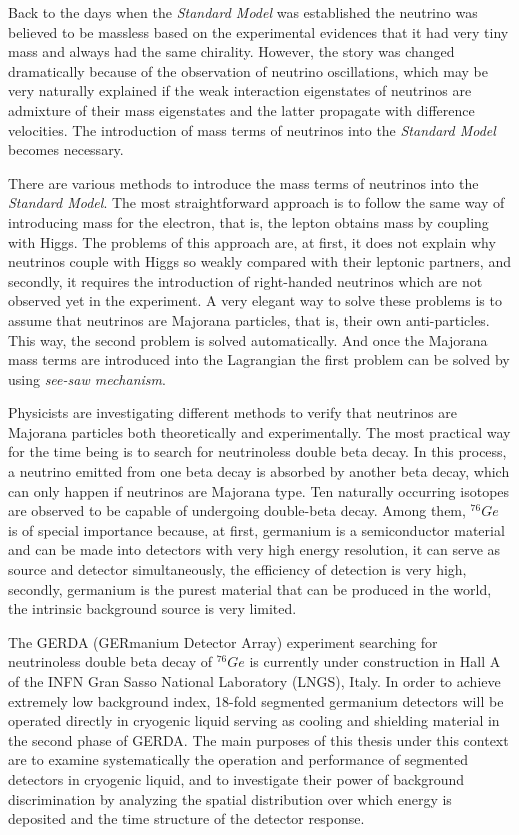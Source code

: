 Back to the days when the \emph{Standard Model} was established the
neutrino was believed to be massless based on the experimental
evidences that it had very tiny mass and always had the same
chirality. However, the story was changed dramatically because of the
observation of neutrino oscillations, which may be very naturally
explained if the weak interaction eigenstates of neutrinos are
admixture of their mass eigenstates and the latter propagate with
difference velocities. The introduction of mass terms of neutrinos
into the \emph{Standard Model} becomes necessary.

There are various methods to introduce the mass terms of neutrinos
into the \emph{Standard Model}. The most straightforward approach is
to follow the same way of introducing mass for the electron, that is,
the lepton obtains mass by coupling with Higgs. The problems of this
approach are, at first, it does not explain why neutrinos couple with
Higgs so weakly compared with their leptonic partners, and secondly,
it requires the introduction of right-handed neutrinos which are not
observed yet in the experiment. A very elegant way to solve these
problems is to assume that neutrinos are Majorana particles, that is,
their own anti-particles. This way, the second problem is solved
automatically.  And once the Majorana mass terms are introduced into
the Lagrangian the first problem can be solved by using \emph{see-saw
  mechanism}.

Physicists are investigating different methods to verify that
neutrinos are Majorana particles both theoretically and
experimentally. The most practical way for the time being is to search
for neutrinoless double beta decay. In this process, a neutrino
emitted from one beta decay is absorbed by another beta decay, which
can only happen if neutrinos are Majorana type. Ten naturally
occurring isotopes are observed to be capable of undergoing
double-beta decay. Among them, $^{76}Ge$ is of special importance
because, at first, germanium is a semiconductor material and can be
made into detectors with very high energy resolution, it can serve as
source and detector simultaneously, the efficiency of detection is
very high, secondly, germanium is the purest material that can be
produced in the world, the intrinsic background source is very
limited.


The GERDA (GERmanium Detector Array) experiment searching for
neutrinoless double beta decay of $^{76}Ge$ is currently under
construction in Hall A of the INFN Gran Sasso National Laboratory
(LNGS), Italy. In order to achieve extremely low background index,
18-fold segmented germanium detectors will be operated directly in
cryogenic liquid serving as cooling and shielding material in the
second phase of GERDA. The main purposes of this thesis under this
context are to examine systematically the operation and performance of
segmented detectors in cryogenic liquid, and to investigate their
power of background discrimination by analyzing the spatial
distribution over which energy is deposited and the time structure of
the detector response.

